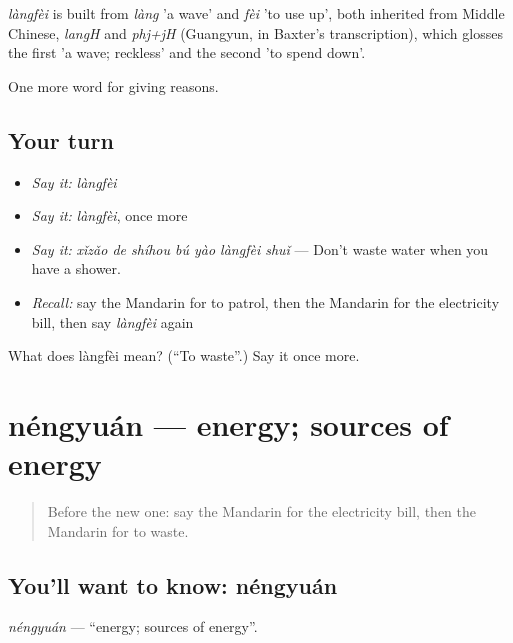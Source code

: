\begin{cousinweb}
\emph{làngfèi} is built from \emph{làng} 'a wave' and \emph{fèi} 'to use up', both inherited from Middle Chinese, \emph{langH} and \emph{phj+jH} (Guangyun, in Baxter's transcription), which glosses the first 'a wave; reckless' and the second 'to spend down'.
\end{cousinweb}

\begin{grammarlens}[title={What you've built}]
One more word for giving reasons.
\end{grammarlens}

\subsection*{Your turn}
\begin{itemize}
\raggedright
  \item \emph{Say it:} \emph{làngfèi}
  \item \emph{Say it:} \emph{làngfèi}, once more
  \item \emph{Say it:} \emph{xǐzǎo de shíhou bú yào làngfèi shuǐ} — Don't waste water when you have a shower.
  \item \emph{Recall:} say the Mandarin for to patrol, then the Mandarin for the electricity bill, then say \emph{làngfèi} again
\end{itemize}

\begin{tcolorbox}[breakable,colback=teal!4,colframe=teal!35!black,title={Before you move on}]
What does làngfèi mean? (\textquotedblleft{}To waste\textquotedblright{}.) Say it once more.
\end{tcolorbox}
\section[néngyuán]{néngyuán — energy; sources of energy}

\label{lesson:ZH-C383-nengyuan}



\begin{quote}
Before the new one: say the Mandarin for the electricity bill, then the Mandarin for to waste.
\end{quote}

\subsection*{You'll want to know: néngyuán}
\emph{néngyuán} — \textquotedblleft{}energy; sources of energy\textquotedblright{}.

